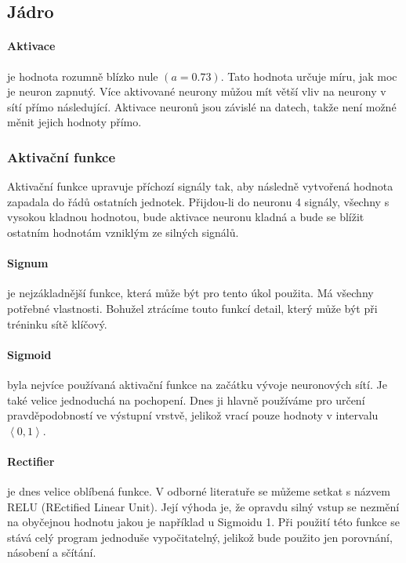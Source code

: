 \documentclass[12pt,a4paper]{report}
\begin{document}
	\subsection{Jádro}
		\paragraph{Aktivace}
		je hodnota rozumně blízko nule $(a=0.73)$. Tato hodnota určuje míru, jak moc je neuron zapnutý. Více aktivované neurony můžou mít větší vliv na neurony v sítí přímo následující. Aktivace neuronů jsou závislé na datech, takže není možné měnit jejich hodnoty přímo.
		\subsubsection{Aktivační funkce}
		Aktivační funkce upravuje příchozí signály tak, aby následně vytvořená hodnota zapadala do řádů ostatních jednotek. Přijdou-li do neuronu 4 signály, všechny s vysokou kladnou hodnotou, bude aktivace neuronu kladná a bude se blížit ostatním hodnotám vzniklým ze silných signálů.
		\paragraph{Signum}
		je nejzákladnější funkce, která může být pro tento úkol použita. Má všechny potřebné vlastnosti. Bohužel ztrácíme touto funkcí detail, který může být při tréninku sítě klíčový.
		\paragraph{Sigmoid}
		byla nejvíce používaná aktivační funkce na začátku vývoje neuronových sítí. Je také velice jednoduchá na pochopení. Dnes ji hlavně používáme pro určení pravděpodobností ve výstupní vrstvě, jelikož vrací pouze hodnoty v intervalu $\left<0,1\right>$.
		\paragraph{Rectifier}
		je dnes velice oblíbená funkce. V odborné literatuře se můžeme setkat s názvem RELU (REctified Linear Unit). Její výhoda je, že opravdu silný vstup se nezmění na obyčejnou hodnotu jakou je například u Sigmoidu 1. Při použití této funkce se stává celý program jednoduše vypočitatelný, jelikož bude použito jen porovnání, násobení a sčítání.
\end{document}
